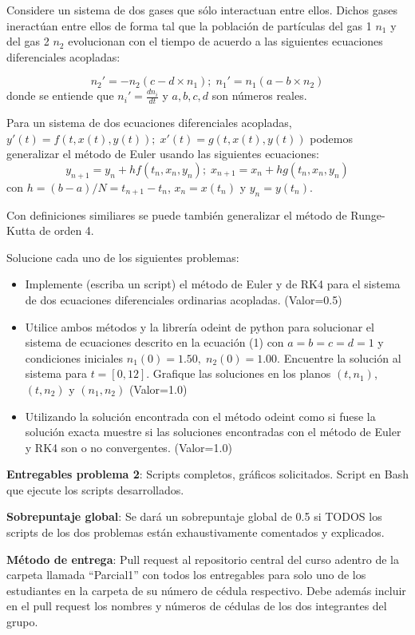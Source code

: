 \documentclass[10.5pt]{article}
\begin{document}
Considere un sistema de dos gases que sólo interactuan entre ellos. Dichos gases ineractúan entre ellos de forma tal que la población de partículas del gas 1 $n_{1}$ y del gas 2 $n_{2}$ evolucionan con el tiempo de acuerdo a las siguientes ecuaciones diferenciales acopladas:

\begin{equation}
  n_{2}'=-n_{2}(c-d\times n_{1}); \; n_{1}'=n_{1}(a-b\times n_{2})
\end{equation} donde se entiende que $n_{i}'=\frac{dn_{i}}{dt}$ y $a,b,c,d$ son números reales.

Para un sistema de dos ecuaciones diferenciales acopladas, $y'(t)=f(t,x(t),y(t));\;x'(t)=g(t,x(t),y(t))$ podemos generalizar el método de Euler usando las siguientes ecuaciones:
\begin{equation}
y_{n+1}=y_{n}+hf(t_{n},x_{n},y_{n});\;x_{n+1}=x_{n}+hg(t_{n},x_{n},y_{n})
\end{equation} con $h=(b-a)/N=t_{n+1}-t_{n}$, $x_{n}=x(t_{n})$ y $y_{n}=y(t_{n})$.

Con definiciones similiares se puede también generalizar el método de Runge-Kutta de orden 4.

Solucione cada uno de los siguientes problemas:

\begin{itemize}
\item Implemente (escriba un script) el método de Euler y de RK4 para el sistema de dos ecuaciones diferenciales ordinarias acopladas. (Valor=0.5)
\item Utilice ambos métodos y la librería odeint de python para solucionar el sistema de ecuaciones descrito en la ecuación (1) con $a=b=c=d=1$ y condiciones iniciales $n_{1}(0)=1.50,\;n_{2}(0)=1.00$. Encuentre la solución al sistema para $t=[0,12]$. Grafique las soluciones en los planos $(t,n_{1})$, $(t,n_{2})$ y $(n_{1},n_{2})$ (Valor=1.0)
\item Utilizando la solución encontrada con el método odeint como si fuese la solución exacta muestre si las soluciones encontradas con el método de Euler y RK4 son o no convergentes. (Valor=1.0)
\end{itemize}

{\bf Entregables problema 2}: Scripts completos, gráficos solicitados. Script en Bash que ejecute los scripts desarrollados.

{\bf Sobrepuntaje global}: Se dará un sobrepuntaje global de 0.5 si TODOS los scripts de los dos problemas están exhaustivamente comentados y explicados.

{\bf M\'{e}todo de entrega}: Pull request al repositorio central del curso adentro de la carpeta llamada ``Parcial1'' con todos los entregables para solo uno de los estudiantes en la carpeta de su número de cédula respectivo. Debe además incluir en el pull request los nombres y números de cédulas de los dos integrantes del grupo.
\end{document}
